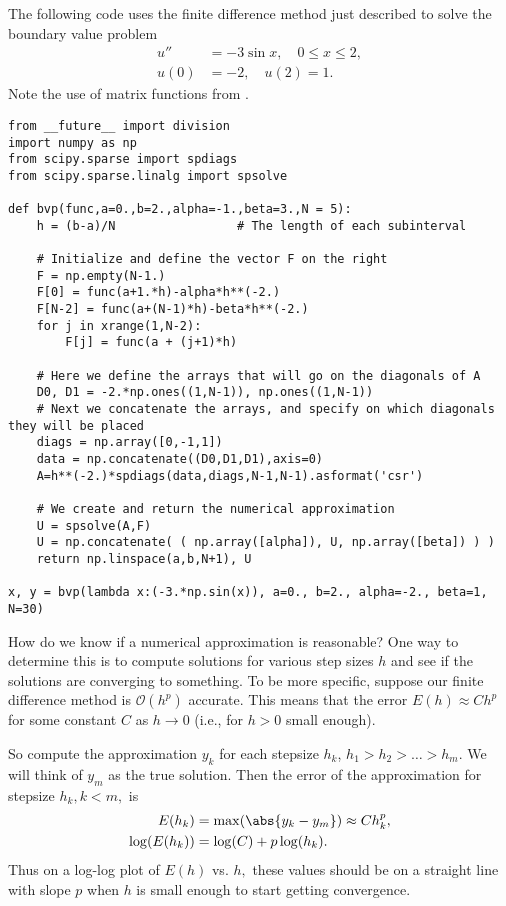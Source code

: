 The following code uses the finite difference method just described to solve the boundary value problem
\begin{align*}
u'' &= -3 \sin{x}, \quad 0 \leq x \leq 2,\\
	u(0) &= -2,\quad u(2) = 1.
\end{align*}
Note the use of matrix functions from . %

\begin{lstlisting}
from __future__ import division
import numpy as np
from scipy.sparse import spdiags
from scipy.sparse.linalg import spsolve

def bvp(func,a=0.,b=2.,alpha=-1.,beta=3.,N = 5):
	h = (b-a)/N 				# The length of each subinterval
	
	# Initialize and define the vector F on the right
	F = np.empty(N-1.)			
	F[0] = func(a+1.*h)-alpha*h**(-2.)
	F[N-2] = func(a+(N-1)*h)-beta*h**(-2.)
	for j in xrange(1,N-2): 
		F[j] = func(a + (j+1)*h)
	
	# Here we define the arrays that will go on the diagonals of A
	D0, D1 = -2.*np.ones((1,N-1)), np.ones((1,N-1))  
	# Next we concatenate the arrays, and specify on which diagonals they will be placed
	diags = np.array([0,-1,1])
	data = np.concatenate((D0,D1,D1),axis=0) 
	A=h**(-2.)*spdiags(data,diags,N-1,N-1).asformat('csr')
	
	# We create and return the numerical approximation
	U = spsolve(A,F)
	U = np.concatenate( ( np.array([alpha]), U, np.array([beta]) ) )
	return np.linspace(a,b,N+1), U

x, y = bvp(lambda x:(-3.*np.sin(x)), a=0., b=2., alpha=-2., beta=1, N=30)
\end{lstlisting}

How do we know if a numerical approximation is reasonable? One way to determine this 
is to compute solutions for various step sizes $h$ and see if the solutions are 
converging to something. To be more specific, suppose our finite difference method 
is $\mathcal{O}(h^p)$ accurate. This means that the error $E(h) \approx Ch^p$ for some constant $C$ as $h \to 0$ (i.e., for $h>0$ small enough).

So compute the approximation $y_k$ for each stepsize $h_k$, $h_1 > h_2> \ldots>h_m.$ 
We will think of $y_m$ as the true solution. Then the error of the approximation for 
stepsize $h_k, k < m,$ is 
\begin{align*}
	E(h_k) &= \max( \abs{ y_k - y_m}) \approx C h_k^p ,\\
	\log(E(h_k)) &= \log(C) + p \log(h_k).
\end{align*}
Thus on a log-log plot of $E(h)$ vs. $h,$ these values should be on a straight line with slope $p$ when $h$ is small enough to start getting convergence. 

